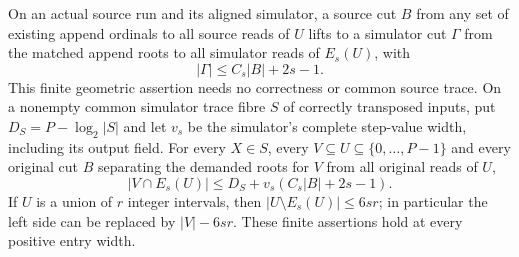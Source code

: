 \begin{proposition}\label{prop:eroded-input-transfer}
On an actual source run and its aligned simulator, a source cut $B$ from
any set of existing append ordinals to all source reads of $U$ lifts to
a simulator cut $\Gamma$ from the matched append roots to all simulator
reads of $E_s(U)$, with
\[
 |\Gamma|\le C_s|B|+2s-1.
\]
This finite geometric assertion needs no correctness or common source trace.
On a nonempty common simulator trace fibre $S$ of correctly transposed inputs,
put $D_S=P-\log_2|S|$ and let $v_s$ be the simulator's complete
step-value width, including its output field. For every $X\in S$,
every $V\subseteq U\subseteq\{0,\ldots,P-1\}$ and every original cut $B$ separating the demanded
roots for $V$ from all original reads of $U$,
\[
|V\cap E_s(U)|\le D_S+v_s(C_s|B|+2s-1).
\]
If $U$ is a union of $r$ integer intervals, then
$|U\setminus E_s(U)|\le6sr$; in particular the left side can be replaced
by $|V|-6sr$. These finite assertions hold at every positive entry width.
\end{proposition}
